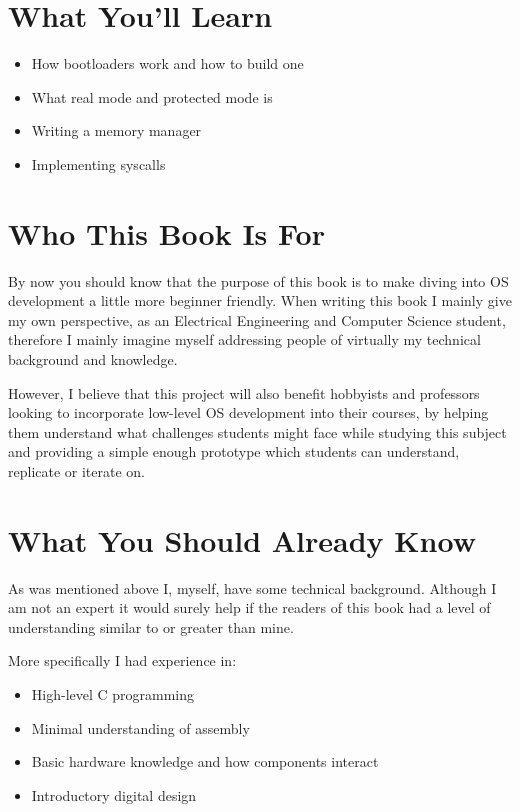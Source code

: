 \section{What You'll Learn}

\begin{itemize}
  \item How bootloaders work and how to build one
  \item What real mode and protected mode is
  \item Writing a memory manager
  \item Implementing syscalls
\end{itemize}

\section{Who This Book Is For}

By now you should know that the purpose of this book is to make diving into OS development a little more beginner friendly.
When writing this book I mainly give my own perspective, as an Electrical Engineering and Computer Science student, therefore
I mainly imagine myself addressing people of virtually my technical background and knowledge. 

However, I believe that this project will also benefit hobbyists and professors looking to incorporate low-level
OS development into their courses, by helping them understand what challenges students might face while studying this
subject and providing a simple enough prototype which students can understand, replicate or iterate on.

\section{What You Should Already Know}

As was mentioned above I, myself, have some technical background. Although I am not an expert it would surely help
if the readers of this book had a level of understanding similar to or greater than mine.

More specifically I had experience in:
\begin{itemize}
    \item High-level C programming
    \item Minimal understanding of assembly
    \item Basic hardware knowledge and how components interact
    \item Introductory digital design
  \end{itemize}

